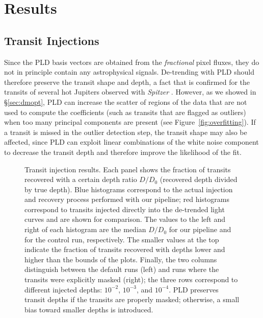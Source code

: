 \documentclass[]{emulateapj}
\begin{document}
\pagebreak

\section{Results}
\label{sec:results}
\subsection{Transit Injections}
\label{sec:injections}
Since the PLD basis vectors are obtained from the \emph{fractional} pixel fluxes,
they do not in principle contain any astrophysical signals. De-trending with PLD
should therefore preserve the transit shape and depth, a fact that is confirmed
for the transits of several hot Jupiters observed with \emph{Spitzer} \citep{DEM15}.
However, as we showed in \S\ref{sec:dmopt}, PLD can increase the
scatter of regions of the data that are not used to compute the coefficients
(such as transits that are flagged as outliers) when too many principal components 
are present (see Figure~\ref{fig:overfitting}). If a transit is missed in the
outlier detection step, the transit shape may also be affected,
since PLD can exploit linear combinations of the white noise component
to decrease the transit depth and therefore improve the likelihood of the fit.

\begin{figure}[h]
  \begin{center}
       \caption{Transit injection results. Each panel shows the fraction of transits
                recovered with a certain depth ratio $D/D_0$ (recovered depth divided
                by true depth). Blue histograms correspond to the actual injection
                and recovery process performed with our pipeline; red histograms
                correspond to transits injected directly into the de-trended
                light curves and are shown for comparison. The values to the left
                and right of each histogram are the median $D/D_0$ for our pipeline
                and for the control run, respectively. The smaller values at the
                top indicate the fraction of transits recovered with depths lower and
                higher than the bounds of the plots. Finally, the two columns distinguish
                between the default runs (left) and runs
                where the transits were explicitly masked (right); the three rows correspond to different
                injected depths: $10^{-2}$, $10^{-3}$, and $10^{-4}$. PLD preserves
                transit depths if the transits are properly masked; otherwise, a small bias
                toward smaller depths is introduced.}
     \label{fig:injections}
  \end{center}
\end{figure}
\end{document}
